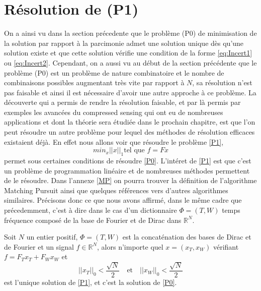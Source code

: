 \section{Résolution de (P1)}
On a ainsi vu dans la section précedente que le problème (P0) de minimisation de la solution par rapport à la parcimonie admet une solution unique dès qu'une solution existe et que cette solution vérifie une condition de la forme \ref{eq:Incert1} ou \ref{eq:Incert2}.
Cependant, on a aussi vu au début de la section précédente que le problème (P0) est un problème de nature combinatoire et le nombre de combinaisons possibles augmentant très vite par rapport à $N$, sa résolution n'est pas faisable et ainsi il est nécessaire d'avoir une autre approche à ce problème.
\newline
La découverte qui a permis de rendre la résolution faisable, et par là permis par exemples les avancées du compressed sensing qui ont eu de nombreuses applications et dont la théorie sera étudiée dans le prochain chapitre, est que l'on peut résoudre un autre problème pour lequel des méthodes de résolution efficaces existaient déjà.
En effet nous allons voir que résoudre le problème \ref{P1},
\begin{equation}\label{P1}\tag{P1}
	min_x ||x||_1 \text{tel que } f = Fx 
\end{equation}
permet sous certaines conditions de résoudre \ref{P0}.
L'intéret de \ref{P1} est que c'est un problème de programmation linéaire et de nombreuses méthodes permettent de le résoudre.
Dans l'annexe \ref{MP} on pourra trouver la définition de l'algorithme Matching Pursuit ainsi que quelques références vers d'autres algorithmes similaires.
Précisons donc ce que nous avons affirmé, dans le même cadre que précedemment, c'est à dire dans le cas d'un dictionnaire $\Phi = (T,W)$ temps fréquence composé de la base de Fourier et de Dirac dans $\mathbb{R}^N$.
\begin{theoreme}\label{th:DiracFourier}
	Soit $N$ un entier positif, $\Phi = (T, W)$ est la concaténation des bases de Dirac et de Fourier et un signal $f\in \mathbb{R}^N$, alors n'importe quel $x = (x_T, x_W)$ vérifiant $f = F_T x_T + F_W x_W$ et
	\begin{equation}\label{eq:cond1}
		||x_T||_0 < \frac{\sqrt{N}}{2} \quad \text{et} \quad   ||x_W||_0 < \frac{\sqrt{N}}{2}
	\end{equation}
	est l'unique solution de \ref{P1}, et c'est la solution de \ref{P0}.
\end{theoreme}
